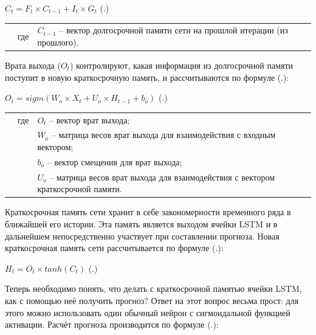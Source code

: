 {  \formulaspace \par \redline 
    $C_t = F_t \times C_{t-1} + I_t \times G_t$
    \hfill (\thechaptercntr .\theformulacntr) \redline
  \formulaspace \addtocounter{formulacntr}{1}

  \begin{tabular}{p{}p{}p{}}
		& где  & $C_{t-1}$ {--} вектор долгосрочной памяти сети на прошлой итерации (из прошлого). \\
  \end{tabular}

  \par \redline Врата выхода ($O_t$) контролируют, какая информация из долгосрочной памяти поступит в новую краткосрочную память, и рассчитываются по формуле (\thechaptercntr .\theformulacntr):

  \formulaspace \par \redline 
    $O_t = sigm(W_o \times X_t + U_o \times H_{t-1} + b_o)$
    \hfill (\thechaptercntr .\theformulacntr) \redline
  \formulaspace \addtocounter{formulacntr}{1}

  \begin{tabular}{p{}p{}p{}}
		& где  & $O_t$ {--} вектор врат выхода; \\
		& 	   & $W_o$ {--} матрица весов врат выхода для взаимодействия с входным вектором; \\
    & 	   & $b_o$ {--} вектор смещения для врат выхода; \\
    & 	   & $U_o$ {--} матрица весов врат выхода для взаимодействия с вектором краткосрочной памяти. \\
  \end{tabular}

  \par \redline Краткосрочная память сети хранит в себе закономерности временного ряда в ближайшей его истории. Эта память является выходом ячейки LSTM и в дальнейшем непосредственно участвует при составлении прогноза. Новая краткосрочная память сети рассчитывается по формуле (\thechaptercntr .\theformulacntr): 

  \formulaspace \par \redline 
    $H_t = O_t \times tanh(C_t)$
    \hfill (\thechaptercntr .\theformulacntr) \redline
  \formulaspace \addtocounter{formulacntr}{1}

  \par \redline Теперь необходимо понять, что делать с краткосрочной памятью ячейки LSTM, как с помощью неё получить прогноз? Ответ на этот вопрос весьма прост: для этого можно использовать один обычный нейрон с сигмоидальной функцией активации. Расчёт прогноза производится по формуле (\thechaptercntr .\theformulacntr):

}
